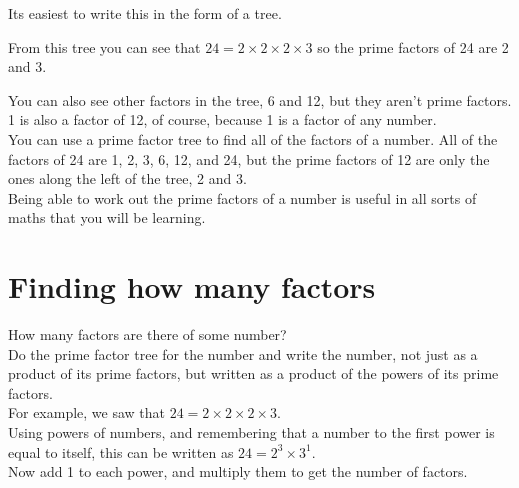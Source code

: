 \documentclass{article}
\begin{document}
Its easiest to write this in the form of a tree.

\begin{center}
\end{center}

From this tree you can see that $24 = 2 \times 2 \times 2 \times 3$ so the prime factors of 24 are 2 and 3.

\pagebreak

You can also see other factors in the tree, 6 and 12, but they aren’t prime factors. 1 is also a factor of 12, of course, because 1 is a factor of any number.\\

You can use a prime factor tree to find all of the factors of a number. All of the factors of 24 are 1, 2, 3, 6, 12, and 24, but the prime factors of 12 are only the ones along the left of the tree, 2 and 3.\\

Being able to work out the prime factors of a number is useful in all sorts of maths that you will be learning.


\pagebreak

\section*{Finding how many factors}

How many factors are there of some number?\\

Do the prime factor tree for the number and write the number, not just as a product of its prime factors, but written as a product of the powers of its prime factors.\\

For example, we saw that $24=2\times2\times2\times3$.\\

Using powers of numbers, and remembering that a number to the first power is equal to itself, this can be written as $24=2^3\times3^1$.\\

Now add 1 to each power, and multiply them to get the number of factors.\\
\end{document}
